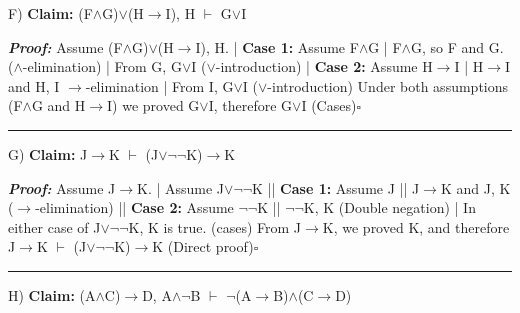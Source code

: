 \documentclass{article}
\begin{document}
F) \textbf{Claim: } (F$\wedge$G)$\lor$(H$\rightarrow$I), H $\vdash$ G$\lor$I\newline

\textbf{\textit{Proof: }}\newline
Assume (F$\wedge$G)$\lor$(H$\rightarrow$I), H.\newline
|	\textbf{Case 1: } Assume F$\wedge$G\newline
|	F$\wedge$G, so F and G. ($\wedge$-elimination)\newline
|	From G, G$\lor$I ($\lor$-introduction)\newline
|	\textbf{Case 2: } Assume H$\rightarrow$I\newline
|	H$\rightarrow$I and H, I $\rightarrow$-elimination\newline
|	From I, G$\lor$I ($\lor$-introduction)\newline
Under both assumptions (F$\wedge$G and H$\rightarrow$I) we proved G$\lor$I, therefore G$\lor$I (Cases)$\square$\newline\rule{10cm}{1pt}\newline



G) \textbf{Claim: } J$\rightarrow$K $\vdash$ (J$\lor$$\neg$$\neg$K)$\rightarrow$K\newline

\textbf{\textit{Proof: }}\newline
Assume J$\rightarrow$K.\newline
|	Assume J$\lor$$\neg$$\neg$K\newline
||		\textbf{Case 1: } Assume J\newline
||		J$\rightarrow$K and J, K ($\rightarrow$-elimination)\newline
||		\textbf{Case 2: } Assume $\neg$$\neg$K\newline
||		$\neg$$\neg$K, K (Double negation)\newline
|	In either case of J$\lor$$\neg$$\neg$K, K is true. (cases)\newline
From J$\rightarrow$K, we proved K, and therefore J$\rightarrow$K $\vdash$ (J$\lor$$\neg$$\neg$K)$\rightarrow$K (Direct proof)$\square$\newline\rule{10cm}{1pt}\newline



H) \textbf{Claim: } (A$\wedge$C)$\rightarrow$D, A$\wedge$$\neg$B $\vdash$ $\neg$(A$\rightarrow$B)$\wedge$(C$\rightarrow$D)\newline
\end{document}
